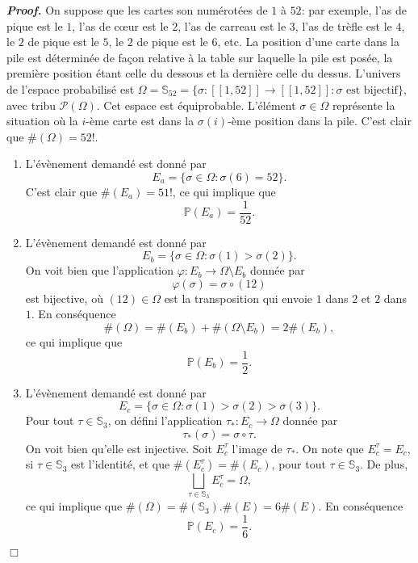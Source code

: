 \documentclass[11pt,a4paper]{article}
\newenvironment{preuve}[1][]
{\vskip 2mm  \noindent\emph{\bf Proof#1. }}{$\Box$ \vskip 2mm}
\begin{document}
		\begin{preuve}
			On suppose que les cartes son numérotées de $1$ à $52$: par exemple, l'as de pique est le $1$, l'as de c{\oe}ur est le $2$, l'as de carreau est le $3$, l'as de trèfle est le $4$, le $2$ de pique est le $5$, le $2$ de pique est le $6$, etc. 
			La position d'une carte dans la pile est déterminée de façon relative à la table sur laquelle la pile est posée, la première position étant celle du dessous et la dernière celle du dessus.
			L'univers de l'espace probabilisé est $\Omega = \mathbb{S}_{52} = \{ \sigma : [\![ 1, 52 ]\!] \rightarrow [\![ 1, 52 ]\!] : \sigma \text{ est bijectif} \}$, avec tribu $\mathscr{P}(\Omega)$. 
			Cet espace est équiprobable. 
			L'élément $\sigma \in \Omega$ représente la situation où la $i$-ème carte est dans la $\sigma(i)$-ème position dans la pile. 
			C'est clair que $\#(\Omega) = 52!$. 
			
			\begin{enumerate}
				\item L'évènement demandé est donné par 
				\[     E_{a} = \big\{ \sigma \in \Omega : \sigma(6) = 52 \big\}.     \]
				C'est clair que $\#(E_{a}) = 51!$, ce qui implique que 
				\[     \mathbb{P}(E_{a}) = \frac{1}{52}.     \]
				
				\item  L'évènement demandé est donné par 
				\[     E_{b} = \big\{ \sigma \in \Omega : \sigma(1) > \sigma(2) \big\}.     \]
				On voit bien que l'application $\varphi : E_{b} \rightarrow \Omega \setminus E_{b}$ donnée par
				\[     \varphi(\sigma) = \sigma \circ (12)    \]
				est bijective, où $(12) \in \Omega$ est la transposition qui envoie $1$ dans $2$ et $2$ dans $1$.
				En conséquence 
				\[     \#(\Omega) = \#(E_{b}) + \#(\Omega \setminus E_{b}) = 2 \#(E_{b}),     \]
				ce qui implique que 
				\[     \mathbb{P}(E_{b}) = \frac{1}{2}.     \]
				
				\item L'évènement demandé est donné par 
				\[     E_{c} = \big\{ \sigma \in \Omega : \sigma(1) > \sigma(2) > \sigma(3) \big\}.     \]
				Pour tout $\tau \in \mathbb{S}_{3}$, on défini l'application $\tau_{*} : E_{c} \rightarrow \Omega$ donnée par
				\[     \tau_{*}(\sigma) = \sigma \circ \tau.    \]
				On voit bien qu'elle est injective. 
				Soit $E_{c}^{\tau}$ l'image de $\tau_{*}$. 
				On note que $E_{c}^{\tau} = E_{c}$, si $\tau \in \mathbb{S}_{3}$ est l'identité, et que $\#(E_{c}^{\tau}) = \#(E_{c})$, pour tout $\tau \in \mathbb{S}_{3}$. 
				De plus, 
				\[     \bigsqcup_{\tau \in \mathbb{S}_{3}} E_{c}^{\tau} = \Omega,     \]
				ce qui implique que $\#(\Omega) = \#(\mathbb{S}_{3}). \#(E) = 6 \#(E)$.  
				En conséquence 
				\[     \mathbb{P}(E_{c}) = \frac{1}{6}.     \]
				

\end{enumerate}
\end{preuve}
\end{document}
